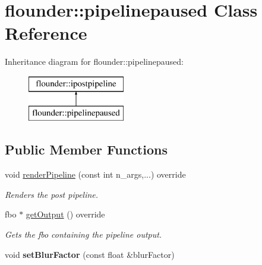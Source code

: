 \hypertarget{classflounder_1_1pipelinepaused}{}\section{flounder\+:\+:pipelinepaused Class Reference}
\label{classflounder_1_1pipelinepaused}
Inheritance diagram for flounder\+:\+:pipelinepaused\+:\begin{figure}[H]
\begin{center}
\leavevmode
\includegraphics[height=2.000000cm]{classflounder_1_1pipelinepaused}
\end{center}
\end{figure}
\subsection*{Public Member Functions}
\begin{DoxyCompactItemize}
\item 
void \hyperlink{classflounder_1_1pipelinepaused_ac3f87a0c31db13f6b25eaf02431c6644}{render\+Pipeline} (const int n\+\_\+args,...) override
\begin{DoxyCompactList}\small\item\em Renders the post pipeline. \end{DoxyCompactList}\item 
fbo $\ast$ \hyperlink{classflounder_1_1pipelinepaused_a7824b6364878b5aaf57921e2a7a4915a}{get\+Output} () override
\begin{DoxyCompactList}\small\item\em Gets the fbo containing the pipeline output. \end{DoxyCompactList}\item 
\mbox{\label{classflounder_1_1pipelinepaused_a1e19831a7dfe80d52eb93021cfec88fd}} 
void {\bfseries set\+Blur\+Factor} (const float \&blur\+Factor)
\end{DoxyCompactItemize}
